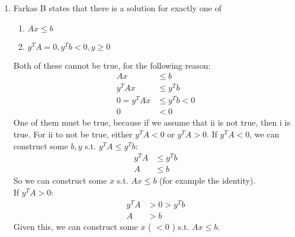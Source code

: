\documentclass[a4paper]{article}
\begin{document}
\begin{enumerate}
\begin{enumerate}
		\item Farkas B states that there is a solution for exactly one of
			\begin{enumerate}
				\item $Ax \leq b$
				\item $y^TA=0, y^Tb<0, y \geq 0$
			\end{enumerate}
			Both of these cannot be true, for the following reason:
			\begin{align}
				Ax &\leq b \\
				y^TAx &\leq y^Tb \\
				0 = y^TAx &\leq y^Tb <0 \\
				0 &< 0
			\end{align}
			One of them must be true, because if we assume that ii is not true, then i is true.  For ii to not be true, either $y^TA < 0$ or $y^TA > 0$.  If $y^TA < 0$, we can construct some $b, y$ s.t. $y^TA \leq y^Tb$:
			\begin{align}
				y^TA &\leq y^Tb \\
				A &\leq b
			\end{align}
			So we can construct some $x$ s.t. $Ax \leq b$ (for example the identity). \\
			If $y^TA > 0$:
			\begin{align}
				y^TA &> 0 > y^Tb \\
				A &> b
			\end{align}
			Given this, we can construct some $x$ ( $< 0$ ) s.t. $Ax \leq b$.
	\end{enumerate}


\end{enumerate}
\end{document}
